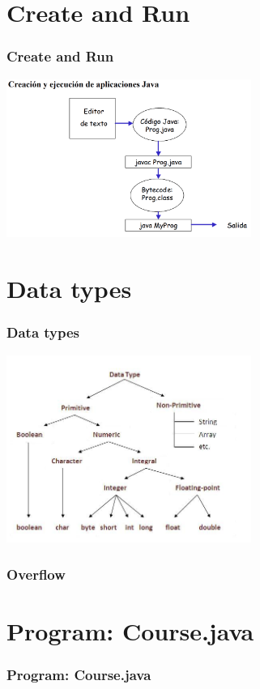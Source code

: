 \documentclass[11pt]{beamer}
\begin{document}
\section{Create and Run}
\begin{frame}
\frametitle{Create and Run}
\begin{center}
{\includegraphics[width=8.0cm]{img/Create_Run_Java.png}}
\end{center}
\end{frame}

\section{Data types}
\begin{frame}
\frametitle{Data types}
\begin{center}
{\includegraphics[width=8.0cm]{img/HQoAn.jpg}}
\end{center}
\end{frame}

\begin{frame}
\frametitle{Overflow}

\end{frame}

\section{Program: Course.java}
\begin{frame}
\frametitle{Program: Course.java}

\end{frame}
\end{document}
